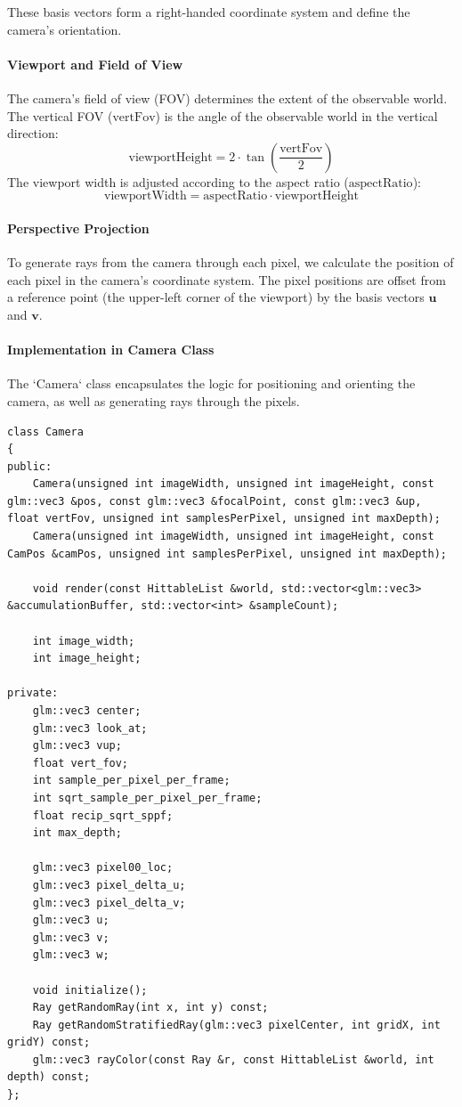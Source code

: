 \documentclass[12pt]{article}
\begin{document}
These basis vectors form a right-handed coordinate system and define the camera's orientation.

\paragraph{Viewport and Field of View}
The camera's field of view (FOV) determines the extent of the observable world. The vertical FOV (\(\text{vertFov}\)) is the angle of the observable world in the vertical direction:
\[
    \text{viewportHeight} = 2 \cdot \tan\left(\frac{\text{vertFov}}{2}\right)
\]
The viewport width is adjusted according to the aspect ratio (\(\text{aspectRatio}\)):
\[
    \text{viewportWidth} = \text{aspectRatio} \cdot \text{viewportHeight}
\]

\paragraph{Perspective Projection}
To generate rays from the camera through each pixel, we calculate the position of each pixel in the camera's coordinate system. The pixel positions are offset from a reference point (the upper-left corner of the viewport) by the basis vectors \(\mathbf{u}\) and \(\mathbf{v}\).

\paragraph{Implementation in Camera Class}
The `Camera` class encapsulates the logic for positioning and orienting the camera, as well as generating rays through the pixels.

\begin{verbatim}
class Camera
{
public:
    Camera(unsigned int imageWidth, unsigned int imageHeight, const glm::vec3 &pos, const glm::vec3 &focalPoint, const glm::vec3 &up, float vertFov, unsigned int samplesPerPixel, unsigned int maxDepth);
    Camera(unsigned int imageWidth, unsigned int imageHeight, const CamPos &camPos, unsigned int samplesPerPixel, unsigned int maxDepth);

    void render(const HittableList &world, std::vector<glm::vec3> &accumulationBuffer, std::vector<int> &sampleCount);

    int image_width;
    int image_height;

private:
    glm::vec3 center;
    glm::vec3 look_at;
    glm::vec3 vup;
    float vert_fov;
    int sample_per_pixel_per_frame;
    int sqrt_sample_per_pixel_per_frame;
    float recip_sqrt_sppf;
    int max_depth;

    glm::vec3 pixel00_loc;
    glm::vec3 pixel_delta_u;
    glm::vec3 pixel_delta_v;
    glm::vec3 u;
    glm::vec3 v;
    glm::vec3 w;

    void initialize();
    Ray getRandomRay(int x, int y) const;
    Ray getRandomStratifiedRay(glm::vec3 pixelCenter, int gridX, int gridY) const;
    glm::vec3 rayColor(const Ray &r, const HittableList &world, int depth) const;
};
\end{verbatim}
\end{document}
